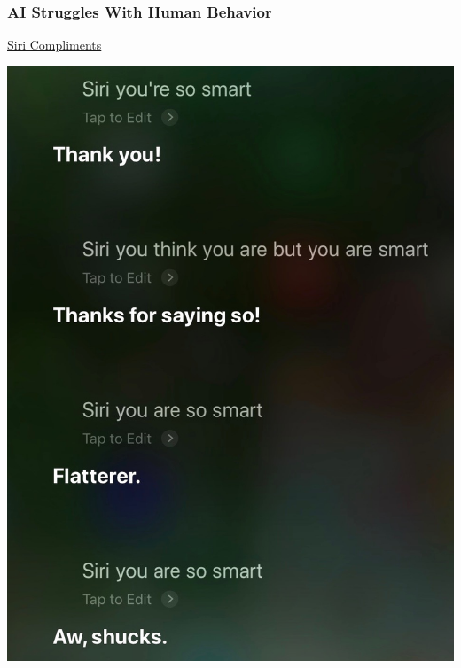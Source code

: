 \begin{frame}
  \frametitle{AI Struggles With Human Behavior}
  \href{run:graphics/siri_smart_sarcasm.m4a}{Siri Compliments}

  \begin{center}
    \includegraphics[height=0.7\textheight]{graphics/siri_transcript}
  \end{center}
\end{frame}

